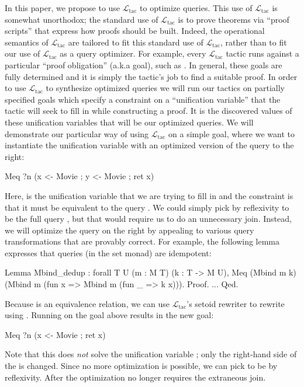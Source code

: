 \documentclass[preprint]{sigplanconf}
\newcommand{\ltac}[0]{\ensuremath{\mathcal{L}_{\mathrm{tac}}}}
\begin{document}
In this paper, we propose to use \ltac{} to optimize queries.  This use of \ltac{} is somewhat unorthodox; the standard use of \ltac{} is to prove theorems via ``proof scripts'' that express how proofs should be built.  Indeed, the operational semantics of \ltac{} are tailored to fit this standard use of \ltac{}, rather than to fit our use of \ltac{} as a query optimizer.  For example, every \ltac{} tactic runs against a particular ``proof obligation'' (a.k.a goal), such as .  In general, these goals are fully determined and it is simply the tactic's job to find a suitable proof.
In order to use \ltac{} to synthesize optimized queries we will run our tactics on partially specified goals which specify a constraint on a ``unification variable'' that the tactic will seek to fill in while constructing a proof.
It is the discovered values of these unification variables that will be our optimized queries.
We will demonstrate our particular way of using \ltac{} on a simple goal, where we want to instantiate the unification variable  with an optimized version of the query to the right:
\begin{coq}
Meq ?n (x <- Movie ; y <- Movie ; ret x)
\end{coq}
Here,  is the unification variable that we are trying to fill in and the constraint is that it must be equivalent to the query .
We could simply pick  by reflexivity to be the full query , but that would require us to do an unnecessary join.  Instead, we will optimize the query on the right by appealing to various query transformations that are provably correct.
For example, the following lemma expresses that queries (in the set monad) are idempotent:
\begin{coq}
Lemma Mbind_dedup : forall {T U} (m : M T) (k : T -> M U),
  Meq (Mbind m k) (Mbind m (fun x => Mbind m (fun _ => k x))).
Proof. ... Qed.
\end{coq}
Because  is an equivalence relation, we can use \ltac's setoid rewriter to rewrite using .
Running  on the goal above results in the new goal:
\begin{coq}
Meq ?n (x <- Movie ; ret x)
\end{coq}
Note that this does \emph{not} solve the unification variable ; only the right-hand side of the  is changed.
Since no more optimization is possible, we can pick  to be  by reflexivity.
After the optimization  no longer requires the extraneous join.
\end{document}
